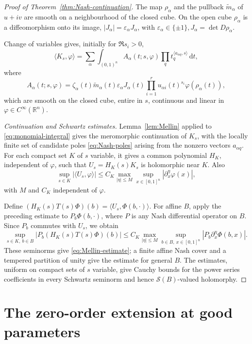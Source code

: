 \documentclass[a4paper,12pt]{amsart}
\numberwithin{equation}{section}
\theoremstyle{definition}
\theoremstyle{remark}
\newcommand{\R}{\mathbb R}
\newcommand{\mcS}{\mathcal S}
\newcommand{\dd}{\mathrm d}
\begin{document}
\begin{proof}[Proof of Theorem~\ref{thm:Nash-continuation}]
The map $\rho_\alpha$ and the pullback $\widetilde m_\alpha$ of $u+iv$ are smooth on a neighbourhood of the closed cube. On the open cube $\rho_\alpha$ is a diffeomorphism onto its image, $|J_\alpha|=\varepsilon_\alpha J_\alpha$, with $\varepsilon_\alpha\in\{\pm1\}, J_\alpha=\det D\rho_\alpha$.

Change of variables gives, initially for $\Re s_i>0$,
\begin{equation}\label{eq:monomial-integral}
 \langle K_s,\varphi\rangle
 =\sum_\alpha\int_{(0,1)^n}A_\alpha(t;s,\varphi)
       \prod_qt_q^{\langle a_{\alpha q},s\rangle}\,\dd t,
\end{equation}
where
\[
 A_\alpha(t;s,\varphi)=\zeta_\alpha(t)\widetilde m_\alpha(t)
     \varepsilon_\alpha J_\alpha(t)\prod_{i=1}^r u_{\alpha i}(t)^{s_i}
     \varphi(\rho_\alpha(t)),
\]
which are smooth on the closed cube, entire in $s$, continuous and linear in $\varphi\in C^\infty(\R^n)$.

\emph{Continuation and Schwartz estimates.}
Lemma~\ref{lem:Mellin} applied to \eqref{eq:monomial-integral} gives the meromorphic continuation of $K_s$, with the locally finite set of candidate poles \eqref{eq:Nash-poles} arising from the nonzero vectors $a_{\alpha q}$. For each compact set $K$ of $s$ variable, it gives a common polynomial $H_K$, independent of $\varphi$, such that $U_s=H_K(s)K_s$ is holomorphic near $K$. Also
\[
 \sup_{s\in K}|\langle U_s,\varphi\rangle|
 \le C_K\max_{|\eta|\le M}\sup_{x\in[0,1]^n}|\partial_x^\eta\varphi(x)|,
\]
with $M$ and $C_K$ independent of $\varphi$.

Define $(H_K(s)T(s)\Phi)(b)=\langle U_s,\Phi(b,\cdot)\rangle$. For affine $B$, apply the preceding estimate to $P_b\Phi(b,\cdot)$, where $P$ is any Nash differential operator on $B$. Since $P_b$ commutes with $U_s$, we obtain
\[
 \sup_{s\in K,\ b\in B}|P_b(H_K(s)T(s)\Phi)(b)|
 \le C_K\max_{|\eta|\le M}\sup_{b\in B,\ x\in[0,1]^n}
       |P_b\partial_x^\eta\Phi(b,x)|.
\]
These seminorms give \eqref{eq:Mellin-estimate}; a finite affine Nash cover and a tempered partition of unity \cite[Theorem~5.2.1]{AG08} give the estimate for general $B$. The estimates, uniform on compact sets of $s$ variable, give Cauchy bounds for the power series coefficients in every Schwartz seminorm and hence $\mcS(B)$-valued holomorphy.
\end{proof}

\section{The zero-order extension at good parameters}\label{sec:zero-order}
\end{document}
